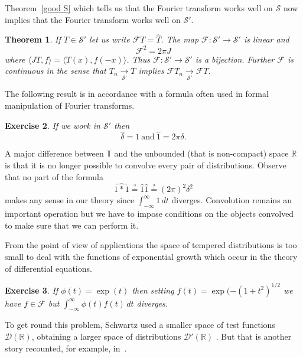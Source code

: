 \documentclass[12pt]{article}
\newtheorem{theorem}{Theorem}[section]
\newtheorem{exercise}[theorem]{Exercise}
\theoremstyle{definition}
\newcommand{\arrows}{\underset{{\mathcal S}'}{\rightarrow}}
\begin{document}
Theorem~\ref{good S} which tells us that the Fourier transform
works well on ${\mathcal S}$ now implies 
that the Fourier transform
works well on ${\mathcal S}'$.
\begin{theorem} 
If $T\in{\mathcal S}'$ let us write
${\mathcal F}T=\hat{T}$.
The map ${\mathcal F}:{\mathcal S}'\rightarrow{\mathcal S}'$
is linear and
\[{\mathcal F}^{2}=2\pi J\]
where $\langle JT,f\rangle=\langle T(x),f(-x)\rangle$. Thus 
${\mathcal F}:{\mathcal S}'\rightarrow{\mathcal S}'$
is a bijection. Further ${\mathcal F}$ is continuous
in the sense that $T_{n}\arrows T$ implies 
${\mathcal F}T_{n}\arrows {\mathcal F}T$.
\end{theorem}
The following result is in accordance with a formula 
often used in formal manipulation of Fourier transforms.
\begin{exercise} If we work in ${\mathcal S}'$ then
\[\hat{\delta}=1\ \text{and}
\ \hat{1}=2\pi\delta.\]
\end{exercise}

A major difference between ${\mathbb T}$ and the
unbounded (that is non-compact) space ${\mathbb R}$
is that it is no longer possible to convolve every
pair of distributions. Observe that no part of
the formula
\[\widehat{1*1}\overset{?}{=}\hat{1}\hat{1}\overset{?}{=}
(2\pi)^{2}\delta^{2}\]
makes any sense in our theory
since $\int_{-\infty}^{\infty}1\,dt$ diverges.
Convolution remains an important operation
but we have to impose conditions on the
objects convolved to make sure that we
can perform it.

From the point of view of applications the space
of tempered distributions is too small to deal with
the functions of exponential growth which occur in the
theory of differential equations.
\begin{exercise} If $\phi(t)=\exp(t)$ then setting
$f(t)=\exp(-(1+t^{2})^{1/2}$ we have $f\in{\mathcal F}$
but $\int_{-\infty}^{\infty}\phi(t)f(t)\,dt$ diverges.
\end{exercise}  
To get round this problem, Schwartz used a smaller
space of test functions ${\mathcal D}({\mathbb R})$, 
obtaining a larger space of distributions
${\mathcal D}'({\mathbb R})$ .
But that is another story recounted, for example,
in~\cite{Friedlander}. 
\end{document}

